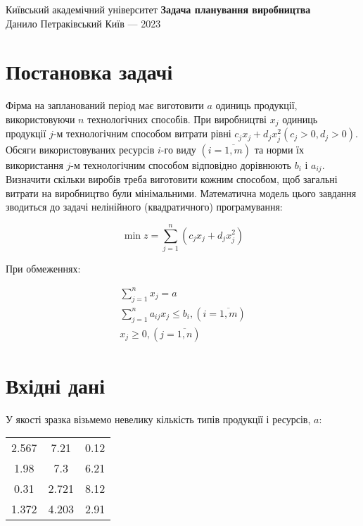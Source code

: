 \documentclass[12pt]{report}
\begin{document}
    \begin{titlepage}
        \centering
        Київський академічний університет
        \vfill
        \vspace{0.5cm}
        \huge \textbf{Задача планування виробництва} \\
        \vspace{0.5cm}
        \normalsize Данило Петраківський
        \vfill
        \normalsize Київ --- 2023
    \end{titlepage}

    \section*{Постановка задачі}\label{sec:problem}

    Фірма на запланований період має виготовити $a$ одиниць продукції, використовуючи $n$ технологічних способів.
    При виробництві $x_j$ одиниць продукції $j$-м технологічним способом витрати рівні
    $c_j x_j + d_j x_j ^ 2 (c_j > 0, d_j > 0)$.
    Обсяги використовуваних ресурсів $i$-го виду $(i = \overline{1, m})$ та норми їх використання $j$-м технологічним
    способом відповідно дорівнюють $b_i$ і $a_{ij}$.
    Визначити скільки виробів треба виготовити кожним способом, щоб загальні витрати на виробництво були мінімальними.
    Математична модель цього завдання зводиться до задачі нелінійного (квадратичного) програмування:

    \[\min z = \sum_{j = 1}^{n} (c_j x_j + d_j x_j ^ 2)\]

    При обмеженнях:

    \begin{gather*}
        \sum_{j = 1}^{n} x_j = a \\
        \sum_{j = 1}^{n} a_{ij} x_j \le b_i, (i = \overline{1, m}) \\
        x_j \ge 0, (j = \overline{1, n})
    \end{gather*}

    \section*{Вхідні дані}\label{sec:input}

    У якості зразка візьмемо невелику кількість типів продукції і ресурсів, $a$:

    \begin{center}
        \begin{tabular}{c c c}
            2.567 & 7.21  & 0.12 \\
            1.98  & 7.3   & 6.21 \\
            0.31  & 2.721 & 8.12 \\
            1.372 & 4.203 & 2.91
        \end{tabular}
    \end{center}
\end{document}
